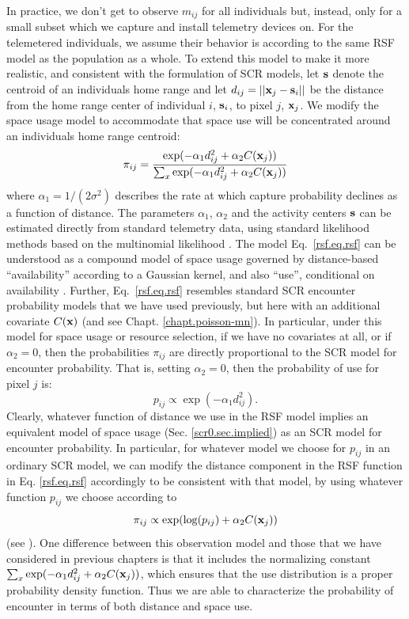 In practice, we don't get to observe $m_{ij}$ for all individuals but,
instead, only for a small subset which we capture and install
telemetry devices on.  For the telemetered individuals, we assume
their behavior is according to the same RSF model as the population as
a whole.  To extend this model to make it more realistic, and
consistent with the formulation of SCR models, let ${\bf s}$ denote
the centroid of an individuals home range and let $d_{ij} = ||{\bf
  x}_{j} - {\bf s}_{i}||$ be the distance from the home range center
of individual $i$, ${\bf s}_{i}$, to pixel $j$, ${\bf x}_{j}$. We
modify the space usage model to accommodate that space use will be
concentrated around an individuals home range centroid:
\begin{equation}
 \pi_{ij} = \frac{ \exp( -\alpha_{1} d_{ij}^{2} +\alpha_{2} C({\bf x}_{j}) ) }
{ \sum_{x} \exp(-\alpha_{1} d_{ij}^{2} +\alpha_{2} C({\bf x}_{j}))}
\label{rsf.eq.rsf}
\end{equation}
where $\alpha_1=1/(2\sigma^2)$ describes the rate at which capture
probability declines as a function of distance.  The parameters
$\alpha_{1}$, $\alpha_{2}$ and the activity centers ${\bf s}$ can be
estimated directly from standard telemetry data, using standard
likelihood methods based on the multinomial likelihood
\citep{johnson_etal:2008}.
The model Eq.~\ref{rsf.eq.rsf} can be understood as a compound model
of space usage governed by distance-based ``availability'' according
to a Gaussian kernel, and also ``use'', conditional on availability
\citep{johnson_etal:2008, forester_etal:2009}.  Further,
Eq.~\ref{rsf.eq.rsf} resembles standard SCR encounter probability
models that we have used previously, but here with an additional
covariate $C({\bf x})$ (and see Chapt. \ref{chapt.poisson-mn}).  In
particular, under this model for space usage or resource selection, if
we have no covariates at all, or if $\alpha_{2} = 0$, then the
probabilities $\pi_{ij}$ are directly proportional to the SCR model
for encounter probability.  That is, setting $\alpha_{2} = 0$, then
the probability of use for pixel $j$ is:
\[
p_{ij} \propto  \exp( -\alpha_{1} d_{ij}^{2}).
\]
Clearly, whatever function of distance we use in the RSF model implies
an equivalent model of space usage (Sec. \ref{scr0.sec.implied}) as an
SCR model for encounter probability.  In particular, for whatever
model we choose for $p_{ij}$ in an ordinary SCR model, we can modify
the distance component in the RSF function in Eq. \ref{rsf.eq.rsf}
accordingly to be consistent with that model, by using whatever
function $p_{ij}$ we choose according to
\[
\pi_{ij} \propto \exp( \log(p_{ij}) + \alpha_{2} C({\bf x}_{j}) )
\]
(see \citep{forester_etal:2009}).
One difference between this observation model and those that we have
considered in previous chapters is that it includes the normalizing
constant $\sum_{x} \exp(-\alpha_{1} d_{ij}^{2} +\alpha_{2} C({\bf
  x}_{j}))$, which ensures that the use distribution is a proper
probability density function. Thus we are able to characterize the
probability of encounter in terms of both distance and space use.

